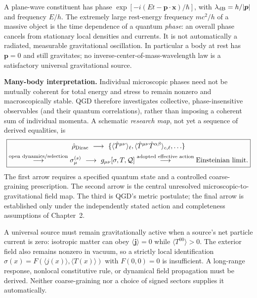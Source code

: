 \documentclass[11pt,a4paper]{article}
\begin{document}
A plane-wave constituent has phase $\exp[-i(Et-\bm p\cdot\bm x)/\hbar]$, with $\lambda_{\rm dB}=h/|\bm p|$ and frequency $E/h$. The extremely large rest-energy frequency $mc^2/h$ of a massive object is the time dependence of a quantum \emph{phase}: an overall phase cancels from stationary local densities and currents.  It is not automatically a radiated, measurable gravitational oscillation. In particular a body at rest has $\bm p=0$ and still gravitates; no inverse-center-of-mass-wavelength law is a satisfactory universal gravitational source.

\noindent\textbf{Many-body interpretation.}
Individual microscopic phases need not be mutually coherent for total energy and stress to remain nonzero and macroscopically stable.  QGD therefore investigates collective, phase-insensitive observables (and their quantum correlations), rather than imposing a coherent sum of individual momenta.  A schematic \emph{research map}, not yet a sequence of derived equalities, is
\begin{equation}\label{eq:qgd-physical-pipeline}
\boxed{\begin{gathered}
  \hat\rho_{\rm Dirac}\ \longrightarrow\
  \{\langle\hat T^{\mu\nu}\rangle_\ell,
       \langle\hat T^{\mu\nu}\hat T^{\alpha\beta}\rangle_{c,\ell},\ldots\}\\
  \overset{\text{open dynamics/selection}}{\longrightarrow}
  \sigma_\mu^{(s)}\ \longrightarrow\ g_{\mu\nu}[\sigma,T,\mathcal Q]
  \overset{\text{adopted effective action}}{\longrightarrow}
  \text{Einsteinian limit}.
\end{gathered}}
\end{equation}
The first arrow requires a specified quantum state and a controlled coarse-graining prescription.  The second arrow is the central unresolved microscopic-to-gravitational field map.  The third is QGD's metric postulate; the final arrow is established only under the independently stated action and completeness assumptions of Chapter~2.

A universal source must remain gravitationally active when a source's net particle current is zero: isotropic matter can obey $\langle\bm j\rangle=0$ while $\langle T^{00}\rangle>0$. The exterior field also remains nonzero in vacuum, so a strictly local identification $\sigma(x)=F(\langle j(x)\rangle,\langle T(x)\rangle)$ with $F(0,0)=0$ is insufficient. A long-range response, nonlocal constitutive rule, or dynamical field propagation must be derived. Neither coarse-graining nor a choice of signed sectors supplies it automatically.
\end{document}
